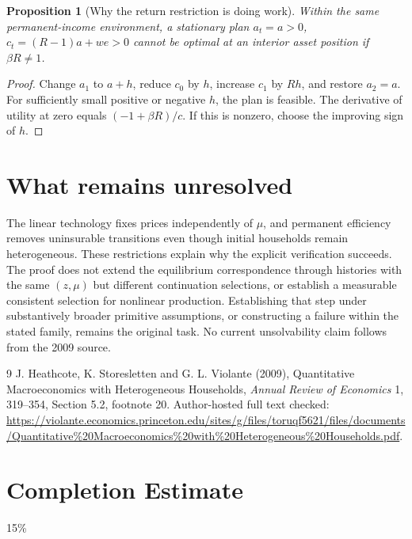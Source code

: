 \documentclass[11pt]{article}
\newtheorem{proposition}{Proposition}
\theoremstyle{definition}
\begin{document}
\begin{proposition}[Why the return restriction is doing work]
Within the same permanent-income environment, a stationary plan $a_t=a>0$, $c_t=(R-1)a+we>0$ cannot be optimal at an interior asset position if $\beta R\ne1$.
\end{proposition}
\begin{proof}
Change $a_1$ to $a+h$, reduce $c_0$ by $h$, increase $c_1$ by $Rh$, and restore $a_2=a$. For sufficiently small positive or negative $h$, the plan is feasible. The derivative of utility at zero equals $(-1+\beta R)/c$. If this is nonzero, choose the improving sign of $h$.
\end{proof}

\section*{What remains unresolved}
The linear technology fixes prices independently of $\mu$, and permanent efficiency removes uninsurable transitions even though initial households remain heterogeneous. These restrictions explain why the explicit verification succeeds. The proof does not extend the equilibrium correspondence through histories with the same $(z,\mu)$ but different continuation selections, or establish a measurable consistent selection for nonlinear production. Establishing that step under substantively broader primitive assumptions, or constructing a failure within the stated family, remains the original task. No current unsolvability claim follows from the 2009 source.
\begin{thebibliography}{9}
 J. Heathcote, K. Storesletten and G. L. Violante (2009), Quantitative Macroeconomics with Heterogeneous Households, \emph{Annual Review of Economics} 1, 319--354, Section 5.2, footnote 20. Author-hosted full text checked: \url{https://violante.economics.princeton.edu/sites/g/files/toruqf5621/files/documents/Quantitative\%20Macroeconomics\%20with\%20Heterogeneous\%20Households.pdf}.
\end{thebibliography}

\section{Completion Estimate}
15\%
\end{document}
